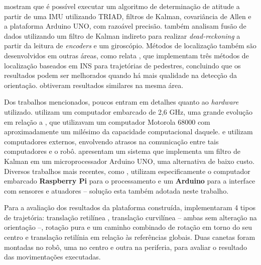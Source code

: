 \cite{lowcostIMU} mostram que é possível executar um algoritmo de determinação de atitude a partir de uma IMU utilizando TRIAD, filtros de Kalman, covariância de Allen e a plataforma Arduino UNO, com razoável precisão. \cite{park1996dead} também analisam fusão de dados utilizando um filtro de Kalman indireto para realizar \emph{dead-reckoning} a partir da leitura de \emph{encoders} e um giroscópio. Métodos de localização também são desenvolvidos em outras áreas, como relata \cite{jimenez2009comparison}, que implementam três métodos de localização baseados em INS para trajetórias de pedestres, concluindo que os resultados podem ser melhorados quando há mais qualidade na detecção da orientação. \cite{steinhoff2010pocket} obtiveram resultados similares na mesma área.

Dos trabalhos mencionados, poucos entram em detalhes quanto ao \emph{hardware} utilizado. \cite{oubbati2005velocity} utilizam um computador embarcado de 2,6 GHz, uma grande evolução em relação a \cite{feng1989servo}, que utilizavam um computador Motorola 68000 com aproximadamente um milésimo da capacidade computacional daquele. \cite{takemura2007development} e \cite{loh2003mechatronics} utilizam computadores externos, envolvendo atrasos na comunicação entre tais computadores e o robô. \cite{lowcostIMU} apresentam um sistema que implementa um filtro de Kalman em um microprocessador Arduino UNO, uma alternativa de baixo custo. Diversos trabalhos mais recentes, como \cite{krinkin2015design}, utilizam especificamente o computador embarcado \textbf{Raspberry Pi} para o processamento e um \textbf{Arduino} para a interface com sensores e atuadores -- solução esta também adotada neste trabalho.

Para a avaliação dos resultados da plataforma construída, \cite{loh2003mechatronics} implementaram 4 tipos de trajetória: translação retilínea , translação curvilínea -- ambas sem alteração na orientação --, rotação pura e um caminho combinado de rotação em torno do seu centro e translação retilínia em relação às referências globais. Duas canetas foram montadas no robô, uma no centro e outra na periferia, para avaliar o resultado das movimentações executadas.
